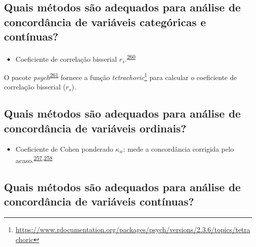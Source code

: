 \documentclass[
  a4paper,
]{book}
\providecommand{\tightlist}{%
  \setlength{\itemsep}{0pt}\setlength{\parskip}{0pt}}
\renewcommand{\href}[2]{#2\footnote{\url{#1}}}
\newenvironment{infobox}[1]
  {
  \begin{itemize}
  \renewcommand{\labelitemi}{
    \raisebox{-.7\height}[0pt][0pt]{
      {\setkeys{Gin}{width=3em,keepaspectratio}
        \texttt{[image: \#1]}}
    }
  }
  \setlength{\fboxsep}{1em}
  \begin{blackbox}
  \item
  }
  {
  \end{blackbox}
  \end{itemize}
  }
\begin{document}
\hypertarget{quais-muxe9todos-suxe3o-adequados-para-anuxe1lise-de-concorduxe2ncia-de-variuxe1veis-categuxf3ricas-e-contuxednuas}{%
\subsection{Quais métodos são adequados para análise de concordância de variáveis categóricas e contínuas?}\label{quais-muxe9todos-suxe3o-adequados-para-anuxe1lise-de-concorduxe2ncia-de-variuxe1veis-categuxf3ricas-e-contuxednuas}}

\begin{itemize}
\tightlist
\item
  Coeficiente de correlação bisserial \(r_{s}\).\textsuperscript{\protect\hyperlink{ref-banerjee1999}{260}}
\end{itemize}

\begin{infobox}{images/Rlogo}
O pacote \emph{psych}\textsuperscript{\protect\hyperlink{ref-psych}{261}} fornece a função \href{https://www.rdocumentation.org/packages/psych/versions/2.3.6/topics/tetrachoric}{\emph{tetrachoric}} para calcular o coeficiente de correlação bisserial (\(r_{s}\)).

\end{infobox}

\hypertarget{quais-muxe9todos-suxe3o-adequados-para-anuxe1lise-de-concorduxe2ncia-de-variuxe1veis-ordinais}{%
\subsection{Quais métodos são adequados para análise de concordância de variáveis ordinais?}\label{quais-muxe9todos-suxe3o-adequados-para-anuxe1lise-de-concorduxe2ncia-de-variuxe1veis-ordinais}}

\begin{itemize}
\tightlist
\item
  Coeficiente de Cohen ponderado \(\kappa_{w}\): mede a concordância corrigida pelo acaso.\textsuperscript{\protect\hyperlink{ref-scott1955}{257},\protect\hyperlink{ref-cohen1960}{258}}
\end{itemize}

\hypertarget{quais-muxe9todos-suxe3o-adequados-para-anuxe1lise-de-concorduxe2ncia-de-variuxe1veis-contuxednuas}{%
\subsection{Quais métodos são adequados para análise de concordância de variáveis contínuas?}\label{quais-muxe9todos-suxe3o-adequados-para-anuxe1lise-de-concorduxe2ncia-de-variuxe1veis-contuxednuas}}
\end{document}
